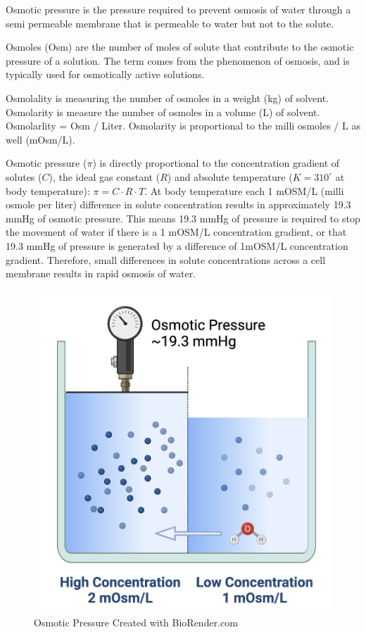 Osmotic pressure is the pressure required to prevent osmosis of water through a semi permeable membrane that is permeable to water but not to the solute.

Osmoles (Osm) are the number of moles of solute that contribute to the osmotic pressure of a solution. The term comes from the phenomenon of osmosis, and is typically used for osmotically active solutions.

Osmolality is measuring the number of osmoles in a weight (kg) of solvent. Osmolarity is measure the number of osmoles in a volume (L) of solvent. Osmolarlity = Osm / Liter. Osmolarity is proportional to the milli osmoles / L as well (mOsm/L).

Osmotic pressure ($\pi$) is directly proportional to the concentration gradient of solutes ($C$), the ideal gas constant ($R$) and absolute temperature ($K = 310^{\circ}$ at body temperature): $\pi = C \cdot R \cdot T$. At body temperature each 1 mOSM/L (milli osmole per liter) difference in solute concentration results in approximately 19.3 mmHg of osmotic pressure. This means 19.3 mmHg of pressure is required to stop the movement of water if there is a 1 mOSM/L concentration gradient, or that 19.3 mmHg of pressure is generated by a difference of 1mOSM/L concentration gradient. Therefore, small differences in solute concentrations across a cell membrane results in rapid osmosis of water.

\begin{figure}[!h]
    \centering
    \includegraphics[width=1\linewidth]{./figure/osmotic_pressure.png}
    \caption{Osmotic Pressure \footnotesize{Created with BioRender.com}}
    \label{fig:osmotic_pressure}
\end{figure}

